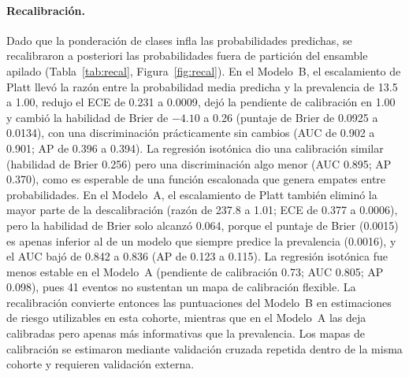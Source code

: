 \documentclass[healthcare,article,submit,pdftex,moreauthors]{Definitions/mdpi_es}
\begin{document}
\paragraph{Recalibración.}
Dado que la ponderación de clases infla las probabilidades predichas, se recalibraron a posteriori las probabilidades fuera de partición del ensamble
apilado (Tabla~\ref{tab:recal}, Figura~\ref{fig:recal}). En el Modelo~B, el escalamiento de Platt llevó la razón entre la probabilidad media predicha y la prevalencia
de 13.5 a 1.00, redujo el ECE de 0.231 a 0.0009, dejó la pendiente de calibración en 1.00 y cambió la habilidad de Brier de
$-4.10$ a 0.26 (puntaje de Brier de 0.0925 a 0.0134), con una discriminación prácticamente sin cambios (AUC de 0.902 a 0.901; AP de 0.396 a 0.394).
La regresión isotónica dio una calibración similar (habilidad de Brier 0.256) pero una discriminación algo menor (AUC 0.895; AP 0.370), como es esperable de una
función escalonada que genera empates entre probabilidades. En el Modelo~A, el escalamiento de Platt también eliminó la mayor parte de la descalibración (razón de 237.8 a 1.01; ECE de 0.377 a 0.0006), pero la habilidad
de Brier solo alcanzó 0.064, porque el puntaje de Brier (0.0015) es apenas inferior al de un modelo que siempre predice la prevalencia (0.0016), y el AUC bajó de 0.842 a 0.836
(AP de 0.123 a 0.115). La regresión isotónica fue menos estable en el Modelo~A (pendiente de calibración 0.73; AUC 0.805; AP 0.098), pues 41 eventos no sustentan un mapa de calibración flexible.
La recalibración convierte entonces las puntuaciones del Modelo~B en estimaciones de riesgo utilizables en esta cohorte, mientras que en el Modelo~A las deja calibradas
pero apenas más informativas que la prevalencia. Los mapas de calibración se estimaron mediante validación cruzada repetida dentro de la misma cohorte y
requieren validación externa.
\end{document}
